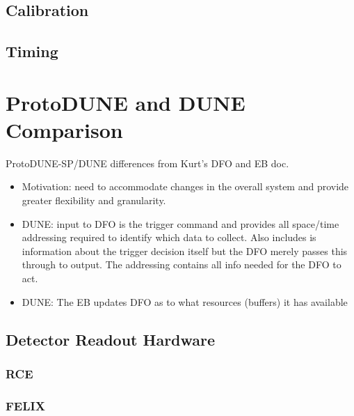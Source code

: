 \subsection{Calibration}
\subsection{Timing}

\section{ProtoDUNE and DUNE Comparison}


ProtoDUNE-SP/DUNE differences from Kurt's DFO and EB doc.
\begin{itemize}
\item Motivation: need to accommodate changes in the overall system and provide greater flexibility and granularity.
\item DUNE: input to DFO is the trigger command and provides all space/time addressing required to identify which data to collect.  Also includes is information about the trigger decision itself but the DFO merely passes this through to output.  The addressing contains all info needed for the DFO to act.
\item DUNE: The EB updates DFO as to what resources (buffers) it has available
\end{itemize}

\subsection{Detector Readout Hardware}


\subsubsection{RCE}

\subsubsection{FELIX}

